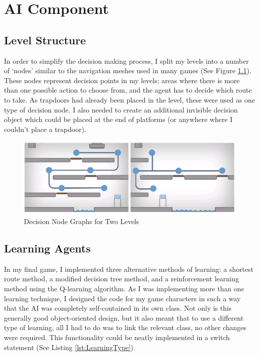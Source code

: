 \documentclass[a4paper,oneside]{report}
\begin{document}
\chapter{AI Component}

\section{Level Structure}

In order to simplify the decision making process, I split my levels into a number of `nodes' similar to the navigation meshes used in many games (See Figure \ref{fig:LevelNodes}). These nodes represent decision points in my levels; areas where there is more than one possible action to choose from, and the agent has to decide which route to take. As trapdoors had already been placed in the level, these were used as one type of decision node. I also needed to create an additional invisible decision object which could be placed at the end of platforms (or anywhere where I couldn't place a trapdoor). 

\begin{figure}[h!]
  \centering
    \includegraphics[width=140mm]{sources/images/LevelNodes}
    \caption{Decision Node Graphs for Two Levels}
    \label{fig:LevelNodes}
\end{figure}

\section{Learning Agents}

In my final game, I implemented three alternative methods of learning: a shortest route method, a modified decision tree method, and a reinforcement learning method using the Q-learning algorithm. As I was implementing more than one learning technique, I designed the code for my game characters in such a way that the AI was completely self-contained in its own class. Not only is this generally good object-oriented design, but it also meant that to use a different type of learning, all I had to do was to link the relevant class, no other changes were required. This functionality could be neatly implemented in a switch statement (See Listing \ref{lst:LearningType}).
\end{document}
